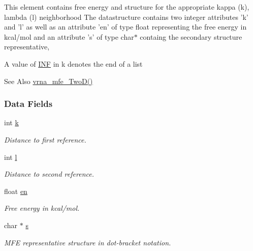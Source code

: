 This element contains free energy and structure for the appropriate kappa (k), lambda (l) neighborhood The datastructure contains two integer attributes 'k' and 'l' as well as an attribute 'en' of type float representing the free energy in kcal/mol and an attribute 's' of type char$\ast$ containg the secondary structure representative,

A value of \hyperlink{energy__const_8h_a12c2040f25d8e3a7b9e1c2024c618cb6}{I\-N\-F} in k denotes the end of a list

\begin{DoxySeeAlso}{See Also}
\hyperlink{group__kl__neighborhood__mfe_ga243c288b463147352829df04de6a2f77}{vrna\-\_\-mfe\-\_\-\-Two\-D()} 
\end{DoxySeeAlso}
\subsubsection*{Data Fields}
\begin{DoxyCompactItemize}
\item 
\hypertarget{group__kl__neighborhood__mfe_ac111e850bb3b3a11b6b5707912cfa1b8}{int \hyperlink{group__kl__neighborhood__mfe_ac111e850bb3b3a11b6b5707912cfa1b8}{k}}\label{group__kl__neighborhood__mfe_ac111e850bb3b3a11b6b5707912cfa1b8}

\begin{DoxyCompactList}\small\item\em Distance to first reference. \end{DoxyCompactList}\item 
\hypertarget{group__kl__neighborhood__mfe_ab8e95cd920901175a2cc8de726ab1d36}{int \hyperlink{group__kl__neighborhood__mfe_ab8e95cd920901175a2cc8de726ab1d36}{l}}\label{group__kl__neighborhood__mfe_ab8e95cd920901175a2cc8de726ab1d36}

\begin{DoxyCompactList}\small\item\em Distance to second reference. \end{DoxyCompactList}\item 
\hypertarget{group__kl__neighborhood__mfe_a7577863a6a84224dfee39b321c03cab1}{float \hyperlink{group__kl__neighborhood__mfe_a7577863a6a84224dfee39b321c03cab1}{en}}\label{group__kl__neighborhood__mfe_a7577863a6a84224dfee39b321c03cab1}

\begin{DoxyCompactList}\small\item\em Free energy in kcal/mol. \end{DoxyCompactList}\item 
\hypertarget{group__kl__neighborhood__mfe_ac5942d2505a6cd7e4a8073a321d5d2d5}{char $\ast$ \hyperlink{group__kl__neighborhood__mfe_ac5942d2505a6cd7e4a8073a321d5d2d5}{s}}\label{group__kl__neighborhood__mfe_ac5942d2505a6cd7e4a8073a321d5d2d5}

\begin{DoxyCompactList}\small\item\em M\-F\-E representative structure in dot-\/bracket notation. \end{DoxyCompactList}\end{DoxyCompactItemize}
\label{structTwoDfold__vars}
\hypertarget{group__kl__neighborhood__mfe_structTwoDfold__vars}{}
